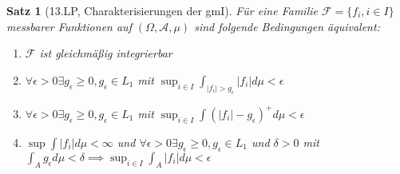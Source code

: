 \documentclass[]{article}
\newtheorem{theorem}{Satz}
\begin{document}
\begin{theorem}[13.LP, Charakterisierungen der gmI]
	Für eine Familie $\mathcal{F}=\{f_i, i\in I\}$ messbarer Funktionen auf $(\Omega, \mathcal{A}, \mu)$ sind folgende Bedingungen äquivalent:
	\begin{enumerate}
		\item $\mathcal{F}$ ist gleichmäßig integrierbar
		\item $\forall \epsilon > 0 \exists g_\epsilon \geq 0, g_\epsilon \in L_1$ mit $\sup_{i\in I} \int_{|f_i| > g_\epsilon} |f_i| d\mu < \epsilon$
		\item $\forall \epsilon > 0 \exists g_\epsilon \geq 0, g_\epsilon \in L_1$ mit $\sup_{i\in I} \int (|f_i| - g_\epsilon)^+ d\mu < \epsilon$
		\item $\sup \int |f_i| d\mu < \infty$ und $\forall \epsilon > 0 \exists g_\epsilon \geq 0, g_\epsilon \in L_1$ und $\delta > 0$ mit $\int_A g_\epsilon d\mu < \delta \implies \sup_{i\in I} \int_A |f_i| d\mu < \epsilon$
	\end{enumerate}
\end{theorem}
\end{document}
